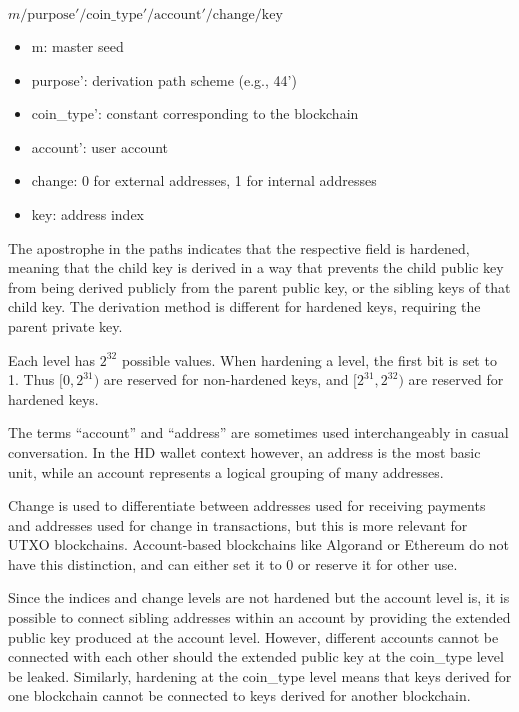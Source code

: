 \documentclass[12pt, a4paper, twocolumn]{article}
\begin{document}
$m / \text{purpose}' / \text{coin\_type}' / \text{account}' / \text{change} / \text{key}$

\begin{itemize}[label=\textendash, itemsep=-0.5em]
  \item m: master seed
  \item purpose': derivation path scheme (e.g., 44')
  \item coin\_type': constant corresponding to the blockchain
  \item account': user account
  \item change: 0 for external addresses, 1 for internal addresses
  \item key: address index
\end{itemize}

The apostrophe in the paths indicates that the respective field is hardened, meaning that the child key is derived in a way that prevents the child public key from being derived publicly from the parent public key, or the sibling keys of that child key. The derivation method is different for hardened keys, requiring the parent private key.

Each level has $2^{32}$ possible values. When hardening a level, the first bit is set to 1. Thus $[0, 2^{31})$ are reserved for non-hardened keys, and $[2^{31}, 2^{32})$ are reserved for hardened keys.

The terms ``account'' and ``address'' are sometimes used interchangeably in casual conversation. In the HD wallet context however, an address is the most basic unit, while an account represents a logical grouping of many addresses. 

Change is used to differentiate between addresses used for receiving payments and addresses used for change in transactions, but this is more relevant for UTXO blockchains. Account-based blockchains like Algorand or Ethereum do not have this distinction, and can either set it to 0 or reserve it for other use.

Since the indices and change levels are not hardened but the account level is, it is possible to connect sibling addresses within an account by providing the extended public key produced at the account level. However, different accounts cannot be connected with each other should the extended public key at the coin\_type level be leaked. Similarly, hardening at the coin\_type level means that keys derived for one blockchain cannot be connected to keys derived for another blockchain.
\end{document}
